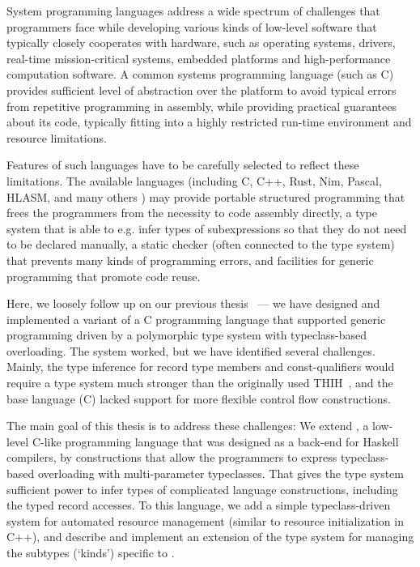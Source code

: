 

System programming languages address a wide spectrum of challenges that programmers face while developing various kinds of low-level software that typically closely cooperates with hardware, such as operating systems, drivers, real-time mission-critical systems, embedded platforms and high-performance computation software.
A common systems programming language (such as C) provides sufficient level of abstraction over the platform to avoid typical errors from repetitive programming in assembly, while providing practical guarantees about its code, typically fitting into a highly restricted run-time environment and resource limitations.

Features of such languages have to be carefully selected to reflect these limitations.
The available languages (including C, C++, Rust, Nim, Pascal, HLASM, and many others ) may provide portable structured programming that frees the programmers from the necessity to code assembly directly, a type system that is able to e.g. infer types of subexpressions so that they do not need to be declared manually, a static checker (often connected to the type system) that prevents many kinds of programming errors, and facilities for generic programming that promote code reuse.

Here, we loosely follow up on our previous thesis~\cite{klepl2020type} --- we have designed and implemented a variant of a C programming language that supported generic programming driven by a polymorphic type system with typeclass-based overloading.
The system worked, but we have identified several challenges.
Mainly, the type inference for record type members and const-qualifiers would require a type system much stronger than the originally used THIH~\cite{jones1999typing}, and the base language (C) lacked support for more flexible control flow constructions.

The main goal of this thesis is to address these challenges: We extend \cmm, a low-level C-like programming language that was designed as a back-end for Haskell compilers, by constructions that allow the programmers to express typeclass-based overloading with multi-parameter typeclasses. That gives the type system sufficient power to infer types of complicated language constructions, including the typed record accesses. To this language, we add a simple typeclass-driven system for automated resource management (similar to resource initialization in C++), and describe and implement an extension of the type system for managing the subtypes (`kinds') specific to \cmm.

